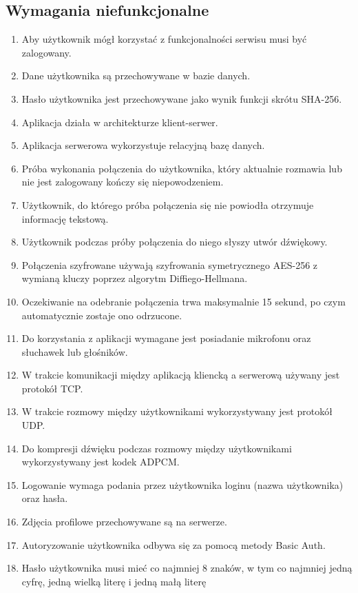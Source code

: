 \documentclass{article}
\begin{document}
  \subsection{Wymagania niefunkcjonalne}
  \begin{enumerate}
    \item Aby użytkownik mógł korzystać z funkcjonalności serwisu musi być zalogowany.
    \item Dane użytkownika są przechowywane w bazie danych.
    \item Hasło użytkownika jest przechowywane jako wynik funkcji skrótu SHA-256.
    \item Aplikacja działa w architekturze klient-serwer.
    \item Aplikacja serwerowa wykorzystuje relacyjną bazę danych.
    \item Próba wykonania połączenia do użytkownika, który aktualnie rozmawia lub nie jest zalogowany kończy się niepowodzeniem.
    \item Użytkownik, do którego próba połączenia się nie powiodła otrzymuje informację tekstową.
    \item Użytkownik podczas próby połączenia do niego słyszy utwór dźwiękowy.
    \item Połączenia szyfrowane używają szyfrowania symetrycznego AES-256 z wymianą kluczy poprzez algorytm Diffiego-Hellmana.
    \item Oczekiwanie na odebranie połączenia trwa maksymalnie 15 sekund, po czym automatycznie zostaje ono odrzucone.
    \item Do korzystania z aplikacji wymagane jest posiadanie mikrofonu oraz słuchawek lub głośników.
    \item W trakcie komunikacji między aplikacją kliencką a serwerową używany jest protokół TCP.
    \item W trakcie rozmowy między użytkownikami wykorzystywany jest protokół UDP.
    \item Do kompresji dźwięku podczas rozmowy między użytkownikami wykorzystywany jest kodek ADPCM.
    \item Logowanie wymaga podania przez użytkownika loginu (nazwa użytkownika) oraz hasła.
    \item Zdjęcia profilowe przechowywane są na serwerze.
    \item Autoryzowanie użytkownika odbywa się za pomocą metody Basic Auth.
    \item Hasło użytkownika musi mieć co najmniej 8 znaków, w tym co najmniej jedną cyfrę, jedną wielką literę i jedną małą literę
  \end{enumerate}
\end{document}
